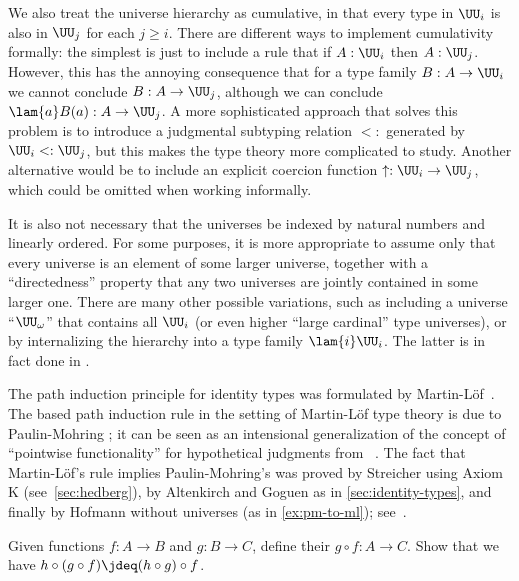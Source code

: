 We also treat the universe hierarchy as cumulative, in that every type in $\UU_i$ is also in $\UU_j$ for each $j\geq i$.
There are different ways to implement cumulativity formally: the simplest is just to include a rule that if $A:\UU_i$ then $A:\UU_j$.
However, this has the annoying consequence that for a type family $B:A\to \UU_i$ we cannot conclude $B:A\to\UU_j$, although we can conclude $\lam{a} B(a) : A\to\UU_j$.
A more sophisticated approach that solves this problem is to introduce a judgmental subtyping relation $<:$ generated by $\UU_i<:\UU_j$, but this makes the type theory more complicated to study.
Another alternative would be to include an explicit coercion function $\uparrow : \UU_i \to \UU_j$, which could be omitted when working informally.

It is also not necessary that the universes be indexed by natural numbers and linearly ordered.
For some purposes, it is more appropriate to assume only that every universe is an element of some larger universe, together with a ``directedness'' property that any two universes are jointly contained in some larger one.
There are many other possible variations, such as including a universe ``$\UU_{\omega}$'' that contains all $\UU_i$ (or even higher ``large cardinal'' type universes), or by internalizing the hierarchy into a type family $\lam{i} \UU_i$.
The latter is in fact done in \Agda.

The path induction principle for identity types was formulated by Martin-L\"{o}f~\cite{Martin-Lof-1972}.
The based path induction rule in the setting of Martin-L\"of type theory is due to Paulin-Mohring \cite{Moh93}; it can be seen as an intensional generalization of the concept of ``pointwise functionality'' for hypothetical judgments from \NuPRL~\cite[Section~8.1]{constable+86nuprl-book}.
The fact that Martin-L\"of's rule implies Paulin-Mohring's was proved by Streicher using Axiom K (see~\cref{sec:hedberg}), by Altenkirch and Goguen as in \cref{sec:identity-types}, and finally by Hofmann without universes (as in \cref{ex:pm-to-ml}); see~\cite[\S1.3 and Addendum]{Streicher93}.

\sectionExercises

\begin{ex}\label{ex:composition}
  Given functions $f:A\to B$ and $g:B\to C$, define their 
 $g\circ f:A\to C$.
  Show that we have $h \circ (g\circ f) \jdeq (h\circ g)\circ f$.
\end{ex}

